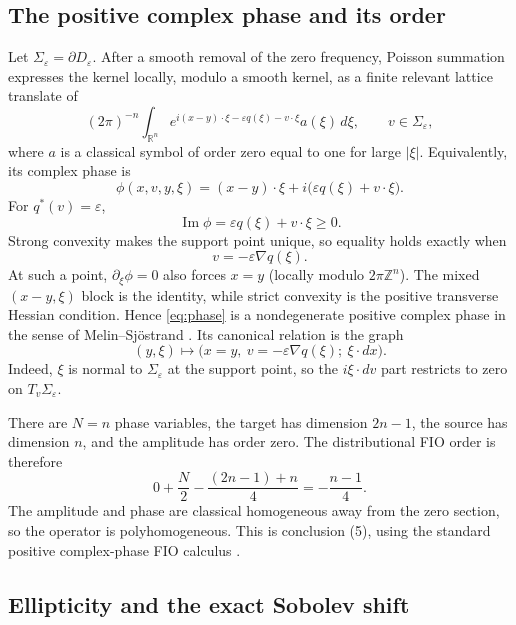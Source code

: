 \documentclass[11pt]{article}
\theoremstyle{remark}
\newcommand{\R}{\mathbb R}
\newcommand{\Z}{\mathbb Z}
\newcommand{\eps}{\varepsilon}
\begin{document}
\subsection{The positive complex phase and its order}

Let $\Sigma_\eps=\partial D_\eps$.  After a smooth removal of the zero
frequency, Poisson summation expresses the kernel locally, modulo a smooth
kernel, as a finite relevant lattice translate of
\begin{equation}\label{eq:osc}
(2\pi)^{-n}\int_{\R^n}
e^{i(x-y)\cdot\xi-\eps q(\xi)-v\cdot\xi}a(\xi)\,d\xi,
\qquad v\in\Sigma_\eps,
\end{equation}
where $a$ is a classical symbol of order zero equal to one for large $|\xi|$.
Equivalently, its complex phase is
\begin{equation}\label{eq:phase}
\phi(x,v,y,\xi)
=(x-y)\cdot\xi+i\bigl(\eps q(\xi)+v\cdot\xi\bigr).
\end{equation}
For $q^*(v)=\eps$,
\[
\operatorname{Im}\phi=\eps q(\xi)+v\cdot\xi\ge0.
\]
Strong convexity makes the support point unique, so equality holds exactly
when
\begin{equation}\label{eq:support}
v=-\eps\nabla q(\xi).
\end{equation}
At such a point, $\partial_\xi\phi=0$ also forces $x=y$ (locally modulo
$2\pi\Z^n$).  The mixed $(x-y,\xi)$ block is the identity, while strict
convexity is the positive transverse Hessian condition.  Hence
\eqref{eq:phase} is a nondegenerate positive complex phase in the sense of
Melin--Sj\"ostrand \cite{MelinSjostrand}.  Its canonical relation is the
graph
\begin{equation}\label{eq:graph}
(y,\xi)\longmapsto
\bigl(x=y,\ v=-\eps\nabla q(\xi);\ \xi\cdot dx\bigr).
\end{equation}
Indeed, $\xi$ is normal to $\Sigma_\eps$ at the support point, so the
$i\xi\cdot dv$ part restricts to zero on $T_v\Sigma_\eps$.

There are $N=n$ phase variables, the target has dimension $2n-1$, the source
has dimension $n$, and the amplitude has order zero.  The distributional FIO
order is therefore
\[
0+\frac{N}{2}-\frac{(2n-1)+n}{4}
=-\frac{n-1}{4}.
\]
The amplitude and phase are classical homogeneous away from the zero section,
so the operator is polyhomogeneous.  This is conclusion (5), using the
standard positive complex-phase FIO calculus
\cite{HormanderFIO,MelinSjostrand}.

\subsection{Ellipticity and the exact Sobolev shift}
\end{document}
